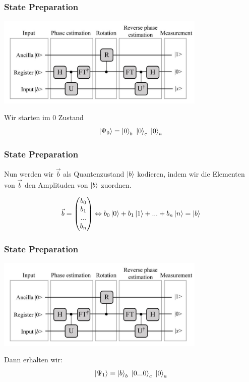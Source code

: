 \begin{frame}
    \frametitle{State Preparation}
    \begin{center}
    \includegraphics[width=10cm]{img/hhl_circuit.jpg}
    \end{center}

    Wir starten im 0 Zustand
    $$\ket{\Psi_0} = \ket{0}_b\ \ket{0}_c\ \ket{0}_a$$


\end{frame}


\begin{frame}
    \frametitle{State Preparation}
    
    \hfil

    Nun werden wir $\vec{b}$ als Quantenzustand $\ket{b}$ kodieren, 
    indem wir die Elementen von $\vec{b}$ den Amplituden von $\ket{b}$ zuordnen.

    $$\vec{b}=\begin{pmatrix} b_0 \\ b_1 \\ ... \\b_n \end{pmatrix}
        \Leftrightarrow b_0 \ket{0} + b_1 \ket{1} + ... + b_n \ket{n} = \ket{b}$$

    \hfil

\end{frame}
\begin{frame}
    \frametitle{State Preparation}
    \begin{center}
    \includegraphics[width=10cm]{img/hhl_circuit.jpg}
    \end{center}

    Dann erhalten wir:
    $$\ket{\Psi_1} = \ket{b}_b\ \ket{0...0}_c\ \ket{0}_a$$


\end{frame}

